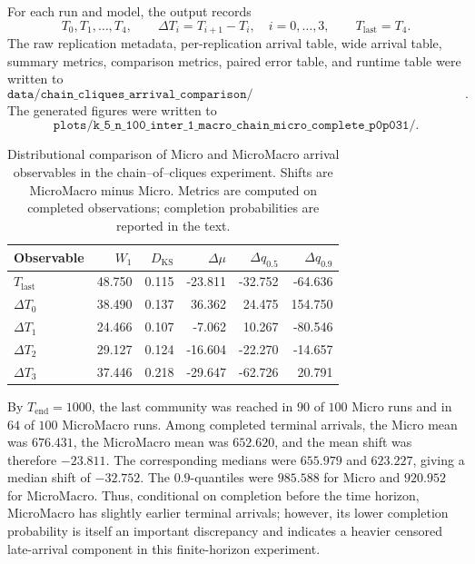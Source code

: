 \documentclass{article}
\begin{document}
For each run and model, the output records
\[
T_0,T_1,\ldots,T_4,\qquad
\Delta T_i=T_{i+1}-T_i,\quad i=0,\ldots,3,
\qquad
T_{\mathrm{last}}=T_4.
\]
The raw replication metadata, per-replication arrival table, wide arrival table, summary metrics, comparison metrics, paired error table, and runtime table were written to
\[
\texttt{data/chain\_cliques\_arrival\_comparison/chain\_L5\_n100\_k1\_beta0p005\_paper\_100reps/}.
\]
The generated figures were written to
\[
\texttt{plots/k\_5\_n\_100\_inter\_1\_macro\_chain\_micro\_complete\_p0p031/}.
\]

\begin{table}[t]
    \centering
    \begin{tabular}{lrrrrr}
        \hline
        Observable & \(W_1\) & \(D_{\mathrm{KS}}\) & \(\Delta\mu\) & \(\Delta q_{0.5}\) & \(\Delta q_{0.9}\) \\
        \hline
        \(T_{\mathrm{last}}\) & 48.750 & 0.115 & -23.811 & -32.752 & -64.636 \\
        \(\Delta T_0\) & 38.490 & 0.137 & 36.362 & 24.475 & 154.750 \\
        \(\Delta T_1\) & 24.466 & 0.107 & -7.062 & 10.267 & -80.546 \\
        \(\Delta T_2\) & 29.127 & 0.124 & -16.604 & -22.270 & -14.657 \\
        \(\Delta T_3\) & 37.446 & 0.218 & -29.647 & -62.726 & 20.791 \\
        \hline
    \end{tabular}
    \caption{Distributional comparison of Micro and MicroMacro arrival observables in the chain--of--cliques experiment. Shifts are MicroMacro minus Micro. Metrics are computed on completed observations; completion probabilities are reported in the text.}
    \label{tab:chain_cliques_arrival_metrics}
\end{table}

By \(T_{\mathrm{end}}=1000\), the last community was reached in \(90\) of \(100\) Micro runs and in \(64\) of \(100\) MicroMacro runs. Among completed terminal arrivals, the Micro mean was \(676.431\), the MicroMacro mean was \(652.620\), and the mean shift was therefore \(-23.811\). The corresponding medians were \(655.979\) and \(623.227\), giving a median shift of \(-32.752\). The \(0.9\)-quantiles were \(985.588\) for Micro and \(920.952\) for MicroMacro. Thus, conditional on completion before the time horizon, MicroMacro has slightly earlier terminal arrivals; however, its lower completion probability is itself an important discrepancy and indicates a heavier censored late-arrival component in this finite-horizon experiment.
\end{document}
